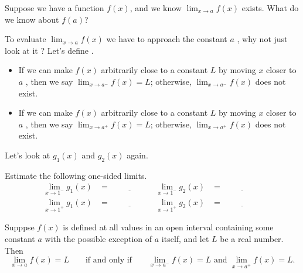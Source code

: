 \documentclass[../main.tex]{subfiles}
\begin{document}
\faComments{} Suppose we have a function \(f(x)\), and we know \(\lim_{x \to a} f(x)\) exists. What do we know about \(f(a)\)?
\clearpage

To evaluate \(\lim_{x \to a} f(x)\) we have to approach the constant \(a\) , why not just look at it ?  Let's define .
\begin{itemize}
  \item If we can make \(f(x)\) arbitrarily close to a constant \(L\) by moving \(x\) closer to \(a\) , then we say \(\lim_{x \to a^{-}} f(x) = L\); otherwise, \(\lim_{x \to a^{-}} f(x)\) does not exist.

  \item If we can make \(f(x)\) arbitrarily close to a constant \(L\) by moving \(x\) closer to \(a\) , then we say \(\lim_{x \to a^{+}} f(x) = L\); otherwise, \(\lim_{x \to a^{+}} f(x)\) does not exist.
\end{itemize}

\begin{example}
  Let's look at \(g_{1}(x)\) and \(g_{2}(x)\) again.

  \begin{center}
    
    \qquad
    
  \end{center}

  Estimate the following one-sided limits.
  \begin{align*}
    \lim_{x \to 1^{-}} g_{1}(x) 
      &= \underline{\hspace{2cm}}
      & \lim_{x \to 1^{-}} g_{2}(x) 
      &= \underline{\hspace{2cm}} \\[2ex]
      \lim_{x \to 1^{+}} g_{1}(x) 
      &= \underline{\hspace{2cm}}
      & \lim_{x \to 1^{+}} g_{2}(x) 
      &= \underline{\hspace{2cm}}
  \end{align*}
\end{example}

\begin{mdframed}[style=withref-compact]
  Supppse \(f(x)\) is defined at all values in an open interval containing some constant \(a\) with the possible exception of \(a\) itself, and let \(L\) be a real number. Then
  \[
    \lim_{x \to a} f(x) = L \qquad\text{if and only if}\qquad \lim_{x \to a^{-}} f(x) = L \text{ and } \lim_{x \to a^{+}} f(x) = L.
  \]
\end{mdframed}
\end{document}
